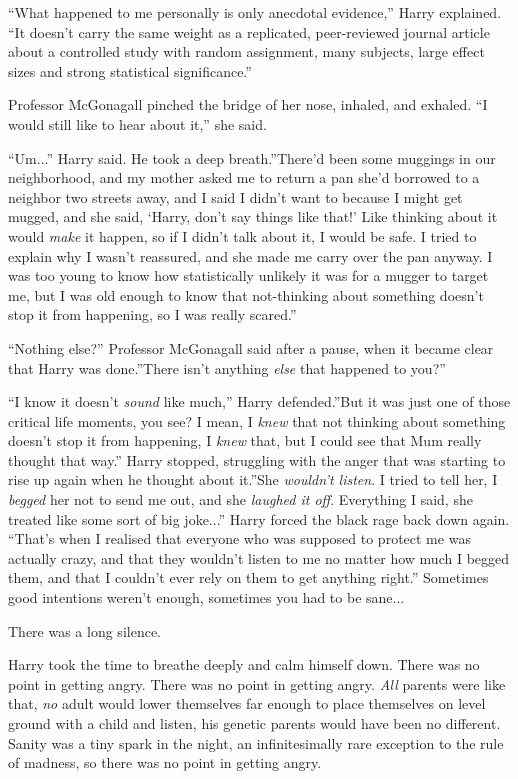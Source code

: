 ``What happened to me personally is only anecdotal evidence,'' Harry
explained. ``It doesn't carry the same weight as a replicated,
peer-reviewed journal article about a controlled study with random
assignment, many subjects, large effect sizes and strong statistical
significance.''

Professor McGonagall pinched the bridge of her nose, inhaled, and
exhaled. ``I would still like to hear about it,'' she said.

``Um...'' Harry said. He took a deep breath.''There'd been some
muggings in our neighborhood, and my mother asked me to return a pan
she'd borrowed to a neighbor two streets away, and I said I didn't want
to because I might get mugged, and she said, `Harry, don't say things
like that!' Like thinking about it would \emph{make} it happen, so if I
didn't talk about it, I would be safe. I tried to explain why I wasn't
reassured, and she made me carry over the pan anyway. I was too young to
know how statistically unlikely it was for a mugger to target me, but I
was old enough to know that not-thinking about something doesn't stop it
from happening, so I was really scared.''

``Nothing else?'' Professor McGonagall said after a pause, when it
became clear that Harry was done.''There isn't anything \emph{else} that
happened to you?''

``I know it doesn't \emph{sound} like much,'' Harry defended.''But it was
just one of those critical life moments, you see? I mean, I \emph{knew}
that not thinking about something doesn't stop it from happening, I
\emph{knew} that, but I could see that Mum really thought that way.''
Harry stopped, struggling with the anger that was starting to rise up
again when he thought about it.''She \emph{wouldn't listen}. I tried to
tell her, I \emph{begged} her not to send me out, and she \emph{laughed
it off}. Everything I said, she treated like some sort of big
joke...'' Harry forced the black rage back down again. ``That's
when I realised that everyone who was supposed to protect me was
actually crazy, and that they wouldn't listen to me no matter how much I
begged them, and that I couldn't ever rely on them to get anything
right.'' Sometimes good intentions weren't enough, sometimes you had to
be sane...

There was a long silence.

Harry took the time to breathe deeply and calm himself down. There was
no point in getting angry. There was no point in getting angry.
\emph{All} parents were like that, \emph{no} adult would lower
themselves far enough to place themselves on level ground with a child
and listen, his genetic parents would have been no different. Sanity was
a tiny spark in the night, an infinitesimally rare exception to the rule
of madness, so there was no point in getting angry.

